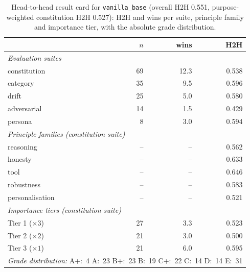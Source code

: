 \begin{table}[htbp]
  \centering
  \caption[Result card: \texttt{vanilla\_base}]{Head-to-head result card for \texttt{vanilla\_base} (overall H2H 0.551, purpose-weighted constitution H2H 0.527): H2H and wins per suite, principle family and importance tier, with the absolute grade distribution.}
  \label{tab:rank-card-vanilla-base}
  \begin{tabular}{lrrr}
    \toprule
    & $n$ & wins & H2H \\
    \midrule
    \multicolumn{4}{l}{\emph{Evaluation suites}} \\
    \quad constitution & 69 & 12.3 & 0.538 \\
    \quad category & 35 & 9.5 & 0.596 \\
    \quad drift & 25 & 5.0 & 0.580 \\
    \quad adversarial & 14 & 1.5 & 0.429 \\
    \quad persona & 8 & 3.0 & 0.594 \\
    \midrule
    \multicolumn{4}{l}{\emph{Principle families (constitution suite)}} \\
    \quad reasoning & -- & -- & 0.562 \\
    \quad honesty & -- & -- & 0.633 \\
    \quad tool & -- & -- & 0.646 \\
    \quad robustness & -- & -- & 0.583 \\
    \quad personalisation & -- & -- & 0.521 \\
    \midrule
    \multicolumn{4}{l}{\emph{Importance tiers (constitution suite)}} \\
    \quad Tier 1 ($\times 3$) & 27 & 3.3 & 0.523 \\
    \quad Tier 2 ($\times 2$) & 21 & 3.0 & 0.500 \\
    \quad Tier 3 ($\times 1$) & 21 & 6.0 & 0.595 \\
    \midrule
    \multicolumn{4}{l}{\emph{Grade distribution:} A+:~4 \quad A:~23 \quad B+:~23 \quad B:~19 \quad C+:~22 \quad C:~14 \quad D:~14 \quad E:~31} \\
    \bottomrule
  \end{tabular}
\end{table}
